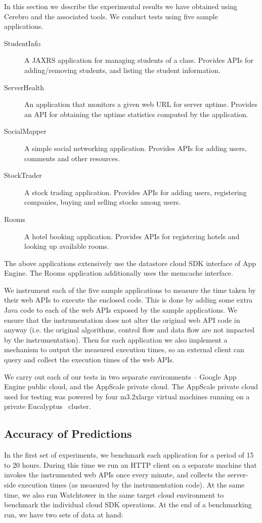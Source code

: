 In this section we describe the experimental results we have obtained using Cerebro and the associated tools. We conduct
tests using five sample applications. 

\begin{description}
\item[StudentInfo] A JAXRS application for managing students of a class. Provides APIs for
adding/removing students, and listing the student information.
\item[ServerHealth] An application that monitors a given web URL for server uptime. Provides an
API for obtaining the uptime statistics computed by the application.
\item[SocialMapper] A simple social networking application. Provides APIs for adding users,
comments and other resources.
\item[StockTrader] A stock trading application. Provides APIs for adding users, registering
companies, buying and selling stocks among users.
\item[Rooms] A hotel booking application. Provides APIs for registering hotels and looking up
available rooms.
\end{description}

The above applications extensively use the datastore cloud SDK interface of App Engine. The Rooms application
additionally uses the memcache interface.

We instrument each of the five sample applications to measure the time taken by their web APIs to execute the
enclosed code. This is done by adding some extra Java code to each of the web APIs exposed by the sample applications.
We ensure that the instrumentation does not alter the original web API code in anyway (i.e. the original algorithms, control flow
and data flow are not impacted by the instrumentation). Then for each application we also
implement a mechanism to output the measured execution times, so an external client can query and collect the execution
times of the web APIs.

We carry out each of our tests in two separate environments -- Google App Engine public cloud, and
the AppScale private cloud. The AppScale private cloud used for testing was powered by four m3.2xlarge virtual machines 
running on a private Eucalyptus~\cite{eucalyptus09} cluster.

\subsection{Accuracy of Predictions}
In the first set of experiments, we benchmark each application for a period of 15 to 20 hours.
During this time we run an HTTP client on a separate machine that invokes the instrumented web APIs once every minute, 
and collects the server-side execution times (as measured by the instrumentation code).
At the same time, we also run Watchtower in the same target cloud environment to
benchmark the individual cloud SDK operations. 
At the end of a benchmarking run, we have two sets of data at hand:

